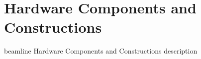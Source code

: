 \section{Hardware Components and Constructions}

beamline Hardware Components and Constructions description


